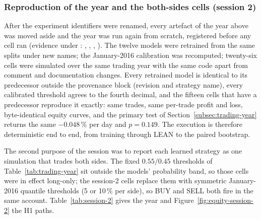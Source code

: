 \subsubsection{Reproduction of the year and the both-sides cells (session 2)} \label{subsec:session-2}

After the experiment identifiers were renamed, every artefact of the year above was moved aside and the year was run again from scratch, registered before any cell ran (evidence under : , , , ). The twelve models were retrained from the same splits under new names; the January-2016 calibration was recomputed; twenty-six cells were simulated over the same trading year with the same code apart from comment and documentation changes. Every retrained model is identical to its predecessor outside the provenance block (revision and strategy name), every calibrated threshold agrees to the fourth decimal, and the fifteen cells that have a predecessor reproduce it exactly: same trades, same per-trade profit and loss, byte-identical equity curves, and the primary test of Section~\ref{subsec:trading-year} returns the same $-0.048\,\%$ per day and $p = 0.149$. The execution is therefore deterministic end to end, from training through LEAN to the paired bootstrap.

The second purpose of the session was to report each learned strategy as one simulation that trades both sides. The fixed $0.55/0.45$ thresholds of Table~\ref{tab:trading-year} sit outside the models' probability band, so those cells were in effect long-only; the session-2 cells replace them with symmetric January-2016 quantile thresholds (5 or 10\,\% per side), so BUY and SELL both fire in the same account. Table~\ref{tab:session-2} gives the year and Figure~\ref{fig:equity-session-2} the H1 paths.

